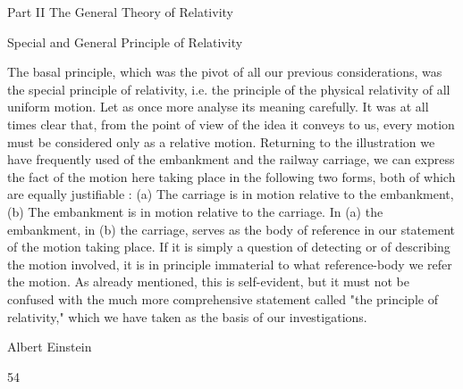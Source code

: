 \documentclass{article}
\begin{document}
Part II
The General Theory of Relativity

Special and General Principle of
Relativity

The basal principle, which was the pivot of all our previous considerations, was the
special principle of relativity, i.e. the principle of the physical relativity of all uniform
motion. Let as once more analyse its meaning carefully.
It was at all times clear that, from the point of view of the idea it conveys to us, every
motion must be considered only as a relative motion. Returning to the illustration we have
frequently used of the embankment and the railway carriage, we can express the fact of the
motion here taking place in the following two forms, both of which are equally justifiable :
(a) The carriage is in motion relative to the embankment,
(b) The embankment is in motion relative to the carriage.
In (a) the embankment, in (b) the carriage, serves as the body of reference in our
statement of the motion taking place. If it is simply a question of detecting or of describing
the motion involved, it is in principle immaterial to what reference-body we refer the
motion. As already mentioned, this is self-evident, but it must not be confused with the
much more comprehensive statement called "the principle of relativity," which we have
taken as the basis of our investigations.

Albert Einstein

54
\end{document}
